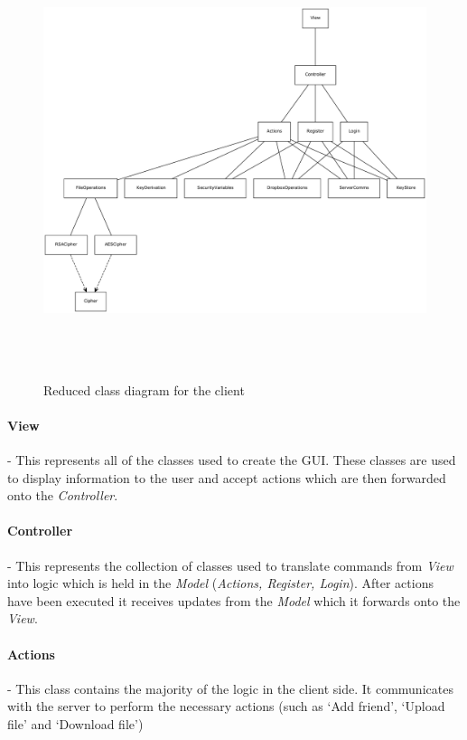 \documentclass[12pt, titlepage]{article}
\begin{document}
\begin{figure}
\centerline{\includegraphics[height=5.0in,width=8in,angle=0]{client-classDiagram.pdf}}
\caption{Reduced class diagram for the client}
\label{fig:reducedClientClass}
\end{figure}

\paragraph*{View} - This represents all of the classes used to create the GUI. These classes are used to display information to the user and accept actions which are then forwarded onto the \textit{Controller}.

\paragraph*{Controller} - This represents the collection of classes used to translate commands from \textit{View} into logic which is held in the \textit{Model} (\textit{Actions, Register, Login}). After actions have been executed it receives updates from the \textit{Model} which it forwards onto the \textit{View}.

\paragraph*{Actions} - This class contains the majority of the logic in the client side. It communicates with the server to perform the necessary actions (such as `Add friend', `Upload file' and `Download file')
\end{document}
